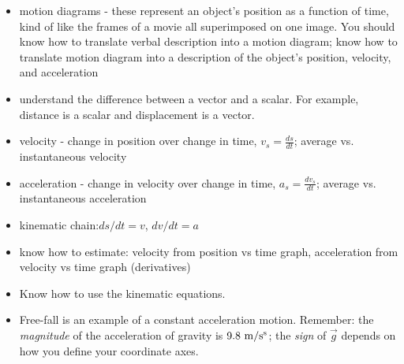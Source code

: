 \begin{itemize}
\item motion diagrams - these represent an object's position as a
  function of time, kind of like the frames of a movie all
  superimposed on one image.  You should know how to translate verbal description into
  a motion diagram; know how to translate motion diagram into a
  description of the object's position, velocity, and acceleration
\item understand the difference between a vector and a scalar.  For
  example, distance is a scalar and displacement is a vector.  
\item velocity - change in position over change in time, $v_s =
  \frac{ds}{dt}$; average vs. instantaneous velocity
\item acceleration - change in velocity over change in time, $a_s =
  \frac{dv_s}{dt}$; average vs. instantaneous acceleration
\item kinematic chain:$ds/dt = v$, $dv/dt = a$
\item know how to estimate: velocity from position vs time graph,
  acceleration from velocity vs time graph (derivatives)
\item Know how to use the kinematic equations.
\item Free-fall is an example of a constant acceleration motion.  Remember: the {\em magnitude} of the acceleration of gravity is
  $\rm 9.8~m/s^s$; the {\em sign} of $\vec{g}$ depends on how you
  define your coordinate axes.
\end{itemize}

